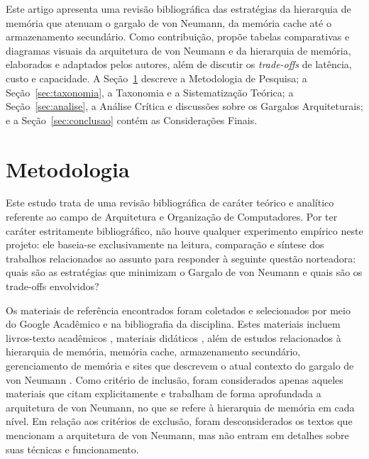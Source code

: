 \documentclass[portuguese]{sbcreviews-2025}%
\begin{document}
Este artigo apresenta uma revisão bibliográfica das estratégias da
hierarquia de memória que atenuam o gargalo de von Neumann, da memória cache até o armazenamento secundário. Como contribuição,
propõe tabelas comparativas e diagramas visuais da arquitetura de von Neumann e da hierarquia de memória, elaborados e adaptados pelos
autores, além de discutir os \textit{trade-offs} de latência, custo e capacidade.
A Seção~\ref{sec:metodologia} descreve a Metodologia de Pesquisa; a
Seção~\ref{sec:taxonomia}, a Taxonomia e a Sistematização Teórica; a
Seção~\ref{sec:analise}, a Análise Crítica e discussões sobre os Gargalos Arquiteturais; e a Seção~\ref{sec:conclusao}
contém as Considerações Finais.
  
\section{Metodologia}
\label{sec:metodologia}

Este estudo trata de uma revisão bibliográfica de caráter teórico e analítico referente ao campo de Arquitetura e Organização de Computadores. Por ter caráter estritamente bibliográfico, 
não houve qualquer experimento empírico neste projeto: ele baseia-se exclusivamente na leitura, comparação e síntese dos trabalhos relacionados ao assunto para responder à seguinte questão 
norteadora: quais são as estratégias que minimizam o Gargalo de von Neumann e quais são os trade-offs envolvidos?

Os materiais de referência encontrados foram coletados e selecionados por meio do Google Acadêmico e na bibliografia da disciplina. Estes materiais incluem livros-texto acadêmicos 
\citep{stallings2010, tanenbaum2013, hennessy2017}, materiais didáticos \citep{miletto2014, oliveira2019, couto2017}, além de estudos relacionados à hierarquia de memória, memória cache, 
armazenamento secundário, gerenciamento de memória e sites que descrevem o atual contexto do gargalo de von Neumann \citep{maues2025, ferreira2015, santos2015, souza2023, hess2025}. Como critério 
de inclusão, foram considerados apenas aqueles materiais que citam explicitamente e trabalham de forma aprofundada a arquitetura de von Neumann, no que se refere à hierarquia de memória em cada nível. 
Em relação aos critérios de exclusão, foram desconsiderados os textos que mencionam a arquitetura de von Neumann, mas não entram em detalhes sobre suas técnicas e funcionamento.
\end{document}
